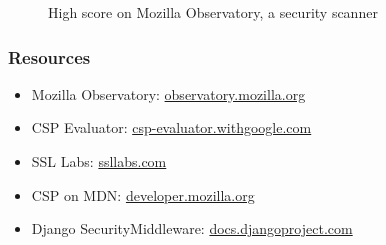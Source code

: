 \documentclass[handout]{beamer}
\begin{document}
\begin{frame}
  \begin{figure}[p]
    \centering
    \caption{High score on Mozilla Observatory, a security scanner}
  \end{figure}
\end{frame}


\begin{frame}
\frametitle{Resources}
  \begin{itemize}
    \item {\small Mozilla Observatory: \href{https://observatory.mozilla.org/}{observatory.mozilla.org}}
    \item {\small CSP Evaluator: \href{https://csp-evaluator.withgoogle.com/}{csp-evaluator.withgoogle.com}}
    \item {\small SSL Labs: \href{https://www.ssllabs.com/}{ssllabs.com}}
    \item {\small CSP on MDN: \href{https://developer.mozilla.org/en-US/docs/Web/HTTP/CSP}{developer.mozilla.org}}
    \item {\small Django SecurityMiddleware: \href{https://docs.djangoproject.com/en/3.2/ref/middleware/\#module-django.middleware.security}{docs.djangoproject.com}}
  \end{itemize}
\end{frame}
\end{document}
